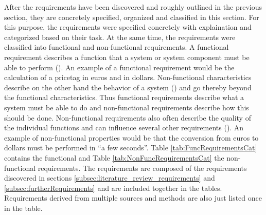 After the requirements have been discovered and roughly outlined in the previous section, they are concretely specified, organized and classified in this section. For this purpose, the requirements were specified concretely with explaination and categorized based on their task. At the same time, the requirements were classified into functional and non-functional requirements. A functional requirement describes a function that a system or system component must be able to perform (\cite{IEEE.1990}). An example of a functional requirement would be the calculation of a pricetag in euros and in dollars. Non-functional characteristics describe on the other hand the behavior of a system (\cite{Seacord.2003}) and go thereby beyond the functional characteristics. Thus functional requirements describe what a system must be able to do and non-functional requirements describe how this should be done. Non-functional requirements also often describe the quality of the individual functions and can influence several other requirements (\cite{Balzert.2011}). An example of non-functional properties would be that the conversion from euros to dollars must be performed in \enquote{a few seconds}. Table \ref{tab:FuncRequirementsCat} contains the functional and Table \ref{tab:NonFuncRequirementsCat} the non-functional requirements. The requirements are composed of the requirements discovered in sections \ref{subsec:literature_review_requirements} and \ref{subsec:furtherRequirements} and are included together in the tables. Requirements derived from multiple sources and methods are also just listed once in the table. 


